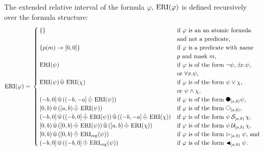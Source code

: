 \begin{definition}
    The extended relative interval of the formula $\varphi$, $\operatorname{ERI}(\varphi)$ is defined recursively over the formula structure:
    \begin{equation*}
        \ERI(\varphi) = \\
        \begin{cases}
            \{\} 
                & \text{if $\varphi$ is an an atomic formula} \\ &\text{and not a predicate,} \\ 
            \{p(m) \rightarrow [0,0]\} 
                & \text{if $\varphi$ is a predicate with name } \\ &\text{$p$ and mask $m$,} \\
            \ERI(\psi) 
                & \text{if $\varphi$ is of the form $\neg \psi, \exists x.\psi$,} \\
                & \text{or $\forall x.\psi$,} \\
            \ERI(\psi) \Cupmerge \ERI(\chi) 
                & \text{if $\varphi$ is of the form $\psi \lor \chi$,} \\ & \text{or $\psi \land \chi$,} \\
            (-b,0] \Cupext ((-b,-a] \oplusext \ERI(\psi)) 
                & \text{if $\varphi$ is of the form $\Previous{[a,b)}\psi$,} \\
            [0,b) \Cupext ([a,b) \oplusext \ERI(\psi)) 
                & \text{if $\varphi$ is of the form $\Next{[a,b)}$,}\\
            (-b,0] \Cupext ((-b,0] \oplusext \ERI(\psi)) \Cupmerge ((-b,-a] \oplusext \ERI(\chi)) 
                & \text{if $\varphi$ is of the form $\psi \Since{[a,b)} \chi$,} \\
            [0,b) \Cupext ([0,b) \oplusext \ERI(\psi)) \Cupmerge ([a,b) \oplusext \ERI(\chi)) 
                & \text{if $\varphi$ is of the form $\psi \Until{[a,b)} \chi$,} \\
            [0,b) \Cupext ([0,b) \oplusext \ERIr(\psi)) 
                & \text{if $\varphi$ is of the form $\Fregex{[a,b)} \psi$, and}\\
            (-b,0] \Cupext ((-b,0] \oplusext \ERIr(\psi)) 
                & \text{if $\varphi$ is of the form $\Pregex{[a,b)} \psi$.}\\
        \end{cases}
    \end{equation*}
\end{definition}

